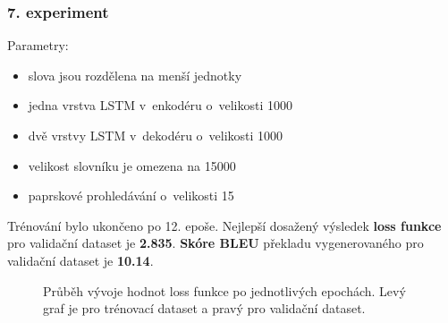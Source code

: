 \subsubsection{7. experiment}\label{experiment7}
Parametry:
\begin{itemize}
  \item slova jsou rozdělena na menší jednotky
  \item jedna vrstva LSTM v~enkodéru o~velikosti 1000
  \item dvě vrstvy LSTM v~dekodéru o~velikosti 1000
  \item velikost slovníku je omezena na 15000
  \item paprskové prohledávání o~velikosti 15
\end{itemize}

Trénování bylo ukončeno po 12. epoše. Nejlepší dosažený výsledek \textbf{loss funkce} pro validační dataset je \textbf{2.835}. \textbf{Skóre BLEU} překladu vygenerovaného pro validační dataset je \textbf{10.14}.

\begin{figure}[H]
    \begin{center}
    \end{center}
	\caption{Průběh vývoje hodnot loss funkce po jednotlivých epochách. Levý graf je pro trénovací dataset a pravý pro validační dataset.}
\end{figure}


